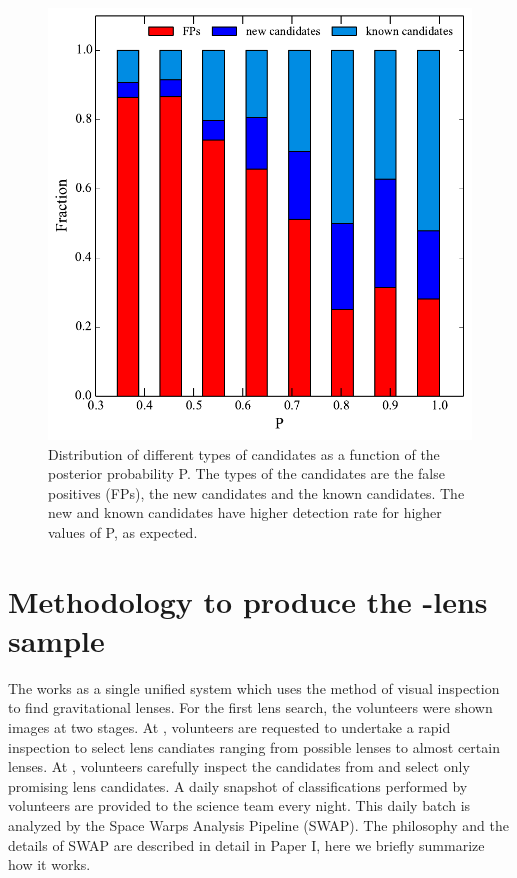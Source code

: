 \documentclass[useAMS,usenatbib,a4paper]{mn2e}
\begin{document}
\begin{figure}
\begin{center}
\includegraphics[scale=0.6]{cand_fp_P_frac.pdf}
\caption{ \label{fig:stackP}
Distribution of different types of candidates as a function of the
posterior probability P. The types of the candidates are the false
positives (FPs), the new candidates and the known candidates. The new
and known candidates have higher detection rate for higher values of P,
as expected.}
\end{center}
\end{figure}


\section{Methodology to produce the \sw-\cfhtls lens sample}
\label{sec:swap}
The \sw works as a single unified system which uses the method of visual
inspection to find gravitational lenses. For the first \sw lens search,
the volunteers were shown images at two stages. At \StageOne, volunteers
are requested to undertake a rapid inspection to select lens candiates
ranging from possible lenses to almost certain lenses. At \StageTwo,
volunteers carefully inspect the candidates from \StageOne and select
only promising lens candidates. A daily snapshot of classifications
performed by volunteers are provided to the science team every night.
This daily batch is analyzed by the Space Warps Analysis Pipeline
(SWAP). The philosophy and the details of SWAP are described in detail
in Paper I, here we briefly summarize how it works.
\end{document}
